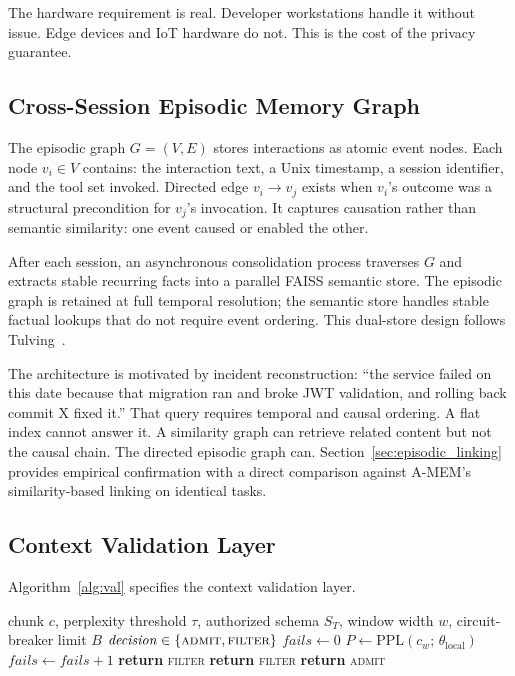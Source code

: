 \documentclass[sigconf,authordraft]{acmart}
\begin{document}
The hardware requirement is real. Developer workstations handle it without
issue. Edge devices and IoT hardware do not. This is the cost of the
privacy guarantee.

\subsection{Cross-Session Episodic Memory Graph}
\label{sec:episodic_arch}

The episodic graph $G=(V,E)$ stores interactions as atomic event nodes.
Each node $v_i \in V$ contains: the interaction text, a Unix timestamp,
a session identifier, and the tool set invoked. Directed edge
$v_i \to v_j$ exists when $v_i$'s outcome was a structural precondition
for $v_j$'s invocation. It captures causation rather than semantic
similarity: one event caused or enabled the other.

After each session, an asynchronous consolidation process traverses $G$
and extracts stable recurring facts into a parallel FAISS semantic store.
The episodic graph is retained at full temporal resolution; the semantic
store handles stable factual lookups that do not require event ordering.
This dual-store design follows Tulving~\cite{tulving1972}.

The architecture is motivated by incident reconstruction: ``the service
failed on this date because that migration ran and broke JWT validation,
and rolling back commit X fixed it.'' That query requires temporal and
causal ordering. A flat index cannot answer it. A similarity graph can
retrieve related content but not the causal chain. The directed episodic
graph can. Section~\ref{sec:episodic_linking} provides empirical
confirmation with a direct comparison against A-MEM's similarity-based
linking on identical tasks.

\subsection{Context Validation Layer}
\label{sec:validation_arch}

Algorithm~\ref{alg:val} specifies the context validation layer.

\begin{algorithm}[t]
\caption{Context Validation}
\label{alg:val}
\begin{algorithmic}[1]
\REQUIRE chunk $c$, perplexity threshold $\tau$, authorized schema $S_T$,
  window width $w$, circuit-breaker limit $B$
\ENSURE $\mathit{decision}\in\{\textsc{admit},\textsc{filter}\}$
\STATE $\mathit{fails}\leftarrow 0$
  \STATE $P\leftarrow\mathrm{PPL}(c_w;\,\theta_{\mathrm{local}})$
    \STATE $\mathit{fails}\leftarrow\mathit{fails}+1$
      \STATE \textbf{return} \textsc{filter}
    \ENDIF
  \ENDIF
\ENDFOR
{}
    \STATE \textbf{return} \textsc{filter}
  \ENDIF
\ENDIF
\STATE \textbf{return} \textsc{admit}
\end{algorithmic}
\end{algorithm}
\end{document}
